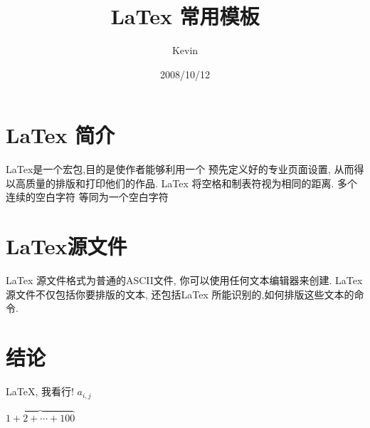 \documentclass[a4paper, 12pt]{article}
\title{LaTex 常用模板}
\author{Kevin}
\date{2008/10/12}
\begin{document}
\maketitle     %
\tableofcontents   %
\section{LaTex 简介}
LaTex是一个宏包,目的是使作者能够利用一个
预先定义好的专业页面设置,
从而得以高质量的排版和打印他们的作品.
LaTex 将空格和制表符视为相同的距离.
多个连续的空白字符 等同为一个空白字符
\section{LaTex源文件}
LaTex 源文件格式为普通的ASCII文件,
你可以使用任何文本编辑器来创建.
LaTex源文件不仅包括你要排版的文本, 还包括LaTex
所能识别的,如何排版这些文本的命令.
\section{结论}
LaTeX, 我看行! $a_{i, j}$

$\overbrace{1+2+\cdots+100}$
\end{document}
